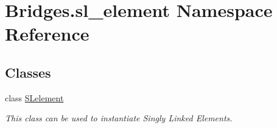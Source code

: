 \hypertarget{namespace_bridges_1_1sl__element}{}\section{Bridges.\+sl\+\_\+element Namespace Reference}
\label{namespace_bridges_1_1sl__element}
\subsection*{Classes}
\begin{DoxyCompactItemize}
\item 
class \hyperlink{class_bridges_1_1sl__element_1_1_s_lelement}{S\+Lelement}
\begin{DoxyCompactList}\small\item\em This class can be used to instantiate Singly Linked Elements. \end{DoxyCompactList}\end{DoxyCompactItemize}
